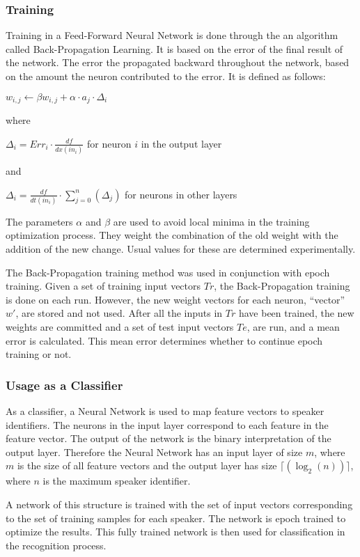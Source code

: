 \subsubsection{Training}

Training in a Feed-Forward Neural Network is done through the an
algorithm called Back-Propagation Learning. It is based on the error
of the final result of the network. The error the propagated backward
throughout the network, based on the amount the neuron contributed to
the error. It is defined as follows:

$w_{i,j} \longleftarrow \beta w_{i,j} + \alpha \cdot a_{j} \cdot \Delta_{i}$

where

$\Delta_{i} = Err_{i} \cdot \frac{df}{dx(in_{i})}$  for neuron $i$ in the output layer

and

$\Delta_{i} = \frac{df}{dt(in_{i})} \cdot \displaystyle\sum_{j=0}^{n}(\Delta_{j})$ for neurons in other layers

The parameters $\alpha$ and $\beta$ are used to avoid local minima in
the training optimization process. They weight the combination of the
old weight with the addition of the new change. Usual values for these
are determined experimentally.

The Back-Propagation training method was used in conjunction with
epoch training. Given a set of training input vectors $Tr$, the
Back-Propagation training is done on each run. However, the new weight
vectors for each neuron, ``vector'' $w'$, are stored and not used. After
all the inputs in $Tr$ have been trained, the new weights are committed
and a set of test input vectors $Te$, are run, and a mean error is
calculated. This mean error determines whether to continue epoch
training or not.

\subsubsection{Usage as a Classifier}

As a classifier, a Neural Network is used to map feature vectors to
speaker identifiers. The neurons in the input layer correspond to each
feature in the feature vector. The output of the network is the binary
interpretation of the output layer. Therefore the Neural Network has
an input layer of size $m$, where $m$ is the size of all feature vectors
and the output layer has size $\lceil(\log_{2}(n))\rceil$, where $n$ is the maximum
speaker identifier.

A network of this structure is trained with the set of input vectors
corresponding to the set of training samples for each speaker. The
network is epoch trained to optimize the results. This fully trained
network is then used for classification in the recognition process.

